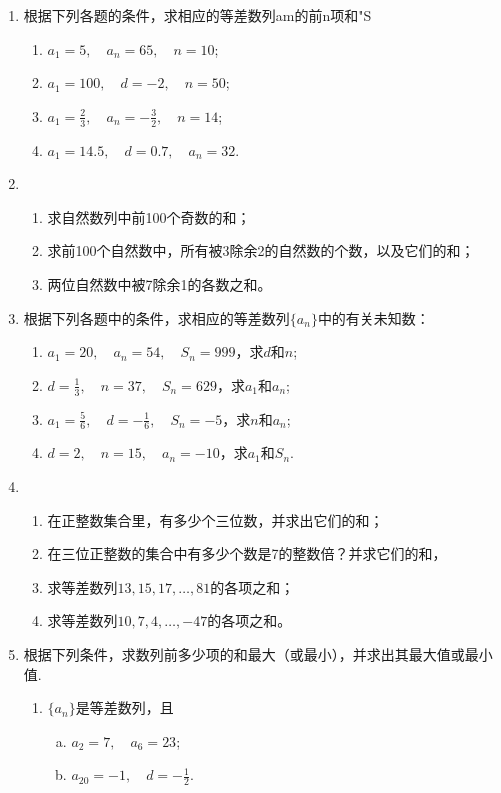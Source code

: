 \begin{ex}
\begin{enumerate}
    \item 根据下列各题的条件，求相应的等差数列{am}的前n项和"S
\begin{enumerate}[(1)]
 \item $a_1=5,\quad a_n=65,\quad n=10$;
\item $a_1=100,\quad d=-2,\quad n=50$;
\item $a_1=\frac{2}{3},\quad a_n=-\frac{3}{2},\quad n=14$;
\item $a_1=14.5,\quad d=0.7,\quad a_n=32$.   
\end{enumerate}

    \item \begin{enumerate}[(1)]
        \item 求自然数列中前100个奇数的和；
        \item 求前100个自然数中，所有被3除余2的自然数的个数，以及它们的和；
        \item 两位自然数中被7除余1的各数之和。
    \end{enumerate} 

    \item 根据下列各题中的条件，求相应的等差数列$\{a_n\}$中的有关未知数：
\begin{enumerate}[(1)]
    \item $a_1=20,\quad a_n=54,\quad S_n=999$，求$d$和$n$;
\item $d=\frac{1}{3},\quad n=37,\quad S_n=629$，求$a_1$和$a_n$;
\item $a_1=\frac{5}{6},\quad d=-\frac{1}{6},\quad S_n=-5$，求$n$和$a_n$;
\item $d=2,\quad n=15,\quad a_n=-10$，求$a_1$和$S_n$.
\end{enumerate}
\item \begin{enumerate}[(1)]
\item 在正整数集合里，有多少个三位数，并求出它们的和；
\item 在三位正整数的集合中有多少个数是7的整数倍？并求它们的和，
\item 求等差数列$13,15,17,\ldots,81$的各项之和；
\item 求等差数列$10,7,4,\ldots,-47$的各项之和。
\end{enumerate}
\item 根据下列条件，求数列前多少项的和最大（或最小），并求出其最大值或最小值.
\begin{enumerate}[(1)]
    \item $\{a_n\}$是等差数列，且
\begin{multicols}{2}
\begin{enumerate}[(a)]
    \item $a_2=7,\quad a_6=23$;
    \item $a_{20}=-1,\quad d=-\frac{1}{2}$.
\end{enumerate}
\end{multicols}


\end{enumerate}
\end{enumerate}
\end{ex}
